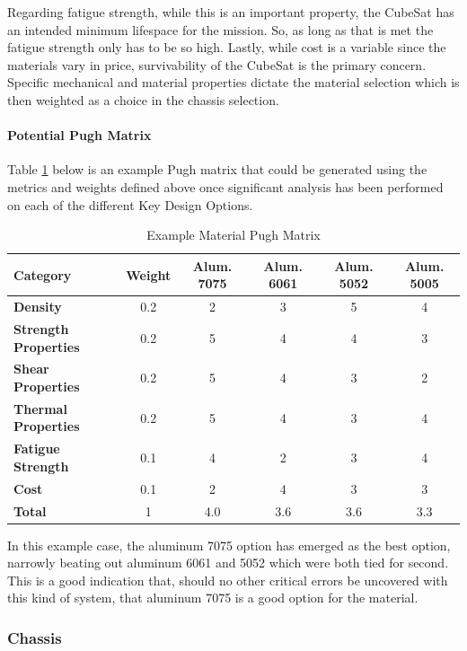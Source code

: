 Regarding fatigue strength, while this is an important property, the CubeSat has an intended minimum lifespace for the mission. So, as long as that is met the fatigue strength only has to be so high. Lastly, while cost is a variable since the materials vary in price, survivability of the CubeSat is the primary concern. Specific mechanical and material properties dictate the material selection which is then weighted as a choice in the chassis selection.

\paragraph{Potential Pugh Matrix}

Table \ref{tbl:material_Pugh} below is an example Pugh matrix that could be generated using the metrics and weights defined above once significant analysis has been performed on each of the different Key Design Options. 
\begin{table}[H]
\centering
\begin{tabular}{|l|c|c|c|c|c|} 
\hline
    \textbf{Category} & \textbf{Weight} & \textbf{Alum. 7075} & \textbf{Alum. 6061} & \textbf{Alum. 5052} & \textbf{Alum. 5005}
    \\
\hline
    \textbf{Density} & 0.2 & 2 & 3 & 5 & 4
    \\
\hline
    \textbf{Strength Properties} & 0.2 & 5 & 4 & 4 & 3 
    \\
\hline
    \textbf{Shear Properties} & 0.2 & 5 & 4 & 3 & 2 
    \\
\hline
    \textbf{Thermal Properties} & 0.2 & 5 & 4 & 3 & 4
    \\
\hline
    \textbf{Fatigue Strength} & 0.1 & 4 & 2 & 3 & 4 
    \\
\hline
    \textbf{Cost} & 0.1 & 2 & 4 & 3 & 3 
    \\
\hline
    \textbf{Total} & 1 & 4.0 & 3.6 & 3.6 & 3.3 
    \\
\hline
\end{tabular}
\caption{Example Material Pugh Matrix }
\label{tbl:material_Pugh}
\end{table}

In this example case, the aluminum 7075 option has emerged as the best option, narrowly beating out aluminum 6061 and 5052 which were both tied for second. This is a good indication that, should no other critical errors be uncovered with this kind of system, that aluminum 7075 is a good option for the material.


\subsubsection{Chassis}
